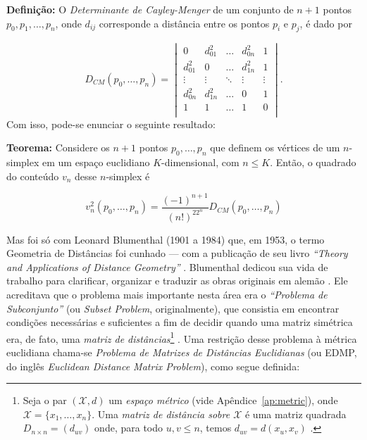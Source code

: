 \begin{center}
	\begin{minipage}{0.9 \linewidth}
		\textbf{Definição:} O \textit{Determinante de Cayley-Menger} de um conjunto de $n+1$ pontos $p_0,p_1,\dots,p_n$, onde $d_{ij}$ corresponde a distância entre os pontos $p_i$ e $p_j$, é dado por
	\end{minipage}
\end{center} 

\begin{equation}\tag{Determinante de Cayley-Menger}
D_{CM}(p_0,\dots,p_n) = 
\begin{vmatrix}
0 & d^2_{01} & \ldots & d^2_{0n} & 1\\ 
d^2_{01} & 0 & \ldots & d^2_{1n} & 1\\ 
\vdots & \vdots & \ddots & \vdots & \vdots\\ 
d^2_{0n} & d^2_{1n} & \ldots & 0 & 1\\ 
1 & 1 & \ldots & 1 & 0\\ 
\end{vmatrix}.
\label{determinanteCayleyMenger}
\end{equation}
Com isso, pode-se enunciar o seguinte resultado:
\begin{center}
	\begin{minipage}{0.9 \linewidth}
		\textbf{Teorema:} Considere os $n+1$ pontos $p_0, \dots, p_n$ que definem os vértices de um $n$-simplex em um espaço euclidiano $K$-dimensional, com $n\leq K$. Então, o quadrado do conteúdo $v_n$ desse $n$-simplex é
	\end{minipage}
\end{center} 

\begin{equation}
v_n^2(p_0, \dots, p_n) = \frac{(-1)^{n+1}}{(n!)^22^n} D_{CM}(p_0, \dots, p_n)
\label{eq:volumeKdimensionalNSimplex}
\end{equation}

Mas foi só com Leonard Blumenthal (1901 a 1984) que, em 1953, o termo Geometria de Distâncias foi cunhado --- com a publicação de seu livro \textit{``Theory and Applications of Distance Geometry''} \cite{Blumenthal:53}.
Blumenthal dedicou sua vida de trabalho para clarificar, organizar e traduzir as obras originais em alemão \cite{libertiEDG}. Ele acreditava que o problema mais importante nesta área era o \textit{``Problema de Subconjunto''} (ou \textit{Subset Problem}, originalmente), que consistia em encontrar condições necessárias e suficientes a fim de decidir quando uma matriz simétrica era, de fato, uma \textit{matriz de distâncias}\footnote{Seja o par $(\mathcal{X}, d)$ um \textit{espaço métrico} (vide Apêndice~\ref{ap:metric}), onde $\mathcal{X} = \{x_1, \dots, x_n\}$. Uma \textit{matriz de distância sobre $\mathcal{X}$} é uma matriz quadrada $D_{n\times n} = (d_{uv})$ onde, para todo $u,v \leq n$, temos $d_{uv} = d(x_u,x_v)$ \cite{carlileGDandAplications}.} \cite{carlileGDandAplications}. Uma restrição desse problema à métrica euclidiana chama-se \textit{Problema de Matrizes de Distâncias Euclidianas} (ou EDMP, do inglês \textit{Euclidean Distance Matrix Problem}), como segue definida:


